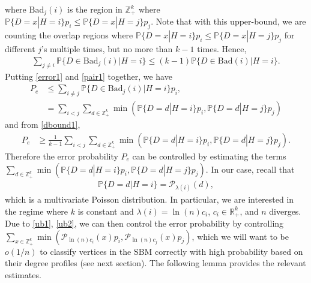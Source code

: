 \documentclass[11pt]{article}
\newcommand{\mR}{\mathbb{R}}
\newcommand{\mZ}{\mathbb{Z}}
\newcommand{\pp}{\mathbb{P}}
\newcommand{\1}{\mathbb{1}}
\begin{document}
where $\text{Bad}_j(i)$ is the region in $\mZ_+^k$ where $\pp \{D=x | H=i\} p_{i} \leq  \pp \{D=x | H=j\} p_{j}$. 
Note that with this upper-bound, we are counting the overlap regions where $\pp \{D=x | H=i\} p_{i} \leq  \pp \{D=x | H=j\} p_{j}$ for different $j$'s multiple times, but no more than $k-1$ times. Hence,  
\begin{align}
\sum_{j \neq i} \pp\{ D \in \text{Bad}_j(i) |H=i\}  \leq (k-1) \pp\{ D \in \text{Bad}(i) | H=i\}. \label{dbound1}
\end{align}
Putting \eqref{error1} and \eqref{pair1} together, we have 
\begin{align}
P_e &\leq  \sum_{i \neq j} \pp\{ D \in \text{Bad}_j(i)  | H=i\}   p_i,\\
 &=\sum_{i < j} \sum_{d \in \mZ_+^k} \min(\pp \{D=d | H=i\} p_{i} ,  \pp \{D=d | H=j\} p_{j}) \label{ub1}
\end{align}
and from \eqref{dbound1},
\begin{align}
P_e &\geq \frac{1}{k-1} \sum_{i < j} \sum_{d \in \mZ_+^k} \min(\pp \{D=d | H=i\} p_{i} ,  \pp \{D=d | H=j\} p_{j}). \label{ub2}
\end{align}
Therefore the error probability $P_e$ can be controlled by estimating the terms $\sum_{d \in \mZ_+^k} \min(\pp \{D=d | H=i\} p_{i} ,  \pp \{D=d | H=j\} p_{j})$. In our case, recall that  
\begin{align}
\pp \{D=d | H=i\} = \mathcal{P}_{\lambda(i)}(d),
\end{align}
which is a multivariate Poisson distribution. In particular, we are interested in the regime where $k$ is constant and $\lambda(i) =  \ln(n) c_i$, $c_i \in \mR_+^k$, and $n$ diverges. 
Due to \eqref{ub1}, \eqref{ub2}, we can then control the error probability by controlling $\sum_{x \in \mZ_+^k} \min(\mathcal{P}_{\ln(n) c_i}(x) p_{i} ,  \mathcal{P}_{\ln(n) c_j}(x) p_{j})$, which we will want to be $o(1/n)$ to classify vertices in the SBM correctly with high probability based on their degree profiles (see next section). The following lemma provides the relevant estimates.  
\end{document}
